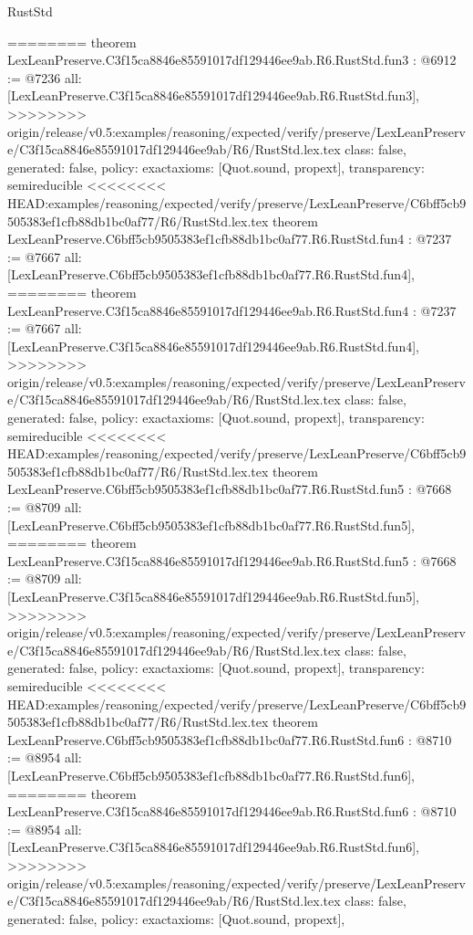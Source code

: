 \begin{lexlean}{RustStd}
\begin{coremodule}
{\begin{coremodule}
{{{{{{========
theorem LexLeanPreserve.C3f15ca8846e85591017df129446ee9ab.R6.RustStd.fun3 : @6912 := @7236 {
  all: [LexLeanPreserve.C3f15ca8846e85591017df129446ee9ab.R6.RustStd.fun3],
>>>>>>>> origin/release/v0.5:examples/reasoning/expected/verify/preserve/LexLeanPreserve/C3f15ca8846e85591017df129446ee9ab/R6/RustStd.lex.tex
  class: false,
  generated: false,
  policy: exact{axioms: [Quot.sound, propext]},
  transparency: semireducible
}
<<<<<<<< HEAD:examples/reasoning/expected/verify/preserve/LexLeanPreserve/C6bff5cb9505383ef1cfb88db1bc0af77/R6/RustStd.lex.tex
theorem LexLeanPreserve.C6bff5cb9505383ef1cfb88db1bc0af77.R6.RustStd.fun4 : @7237 := @7667 {
  all: [LexLeanPreserve.C6bff5cb9505383ef1cfb88db1bc0af77.R6.RustStd.fun4],
========
theorem LexLeanPreserve.C3f15ca8846e85591017df129446ee9ab.R6.RustStd.fun4 : @7237 := @7667 {
  all: [LexLeanPreserve.C3f15ca8846e85591017df129446ee9ab.R6.RustStd.fun4],
>>>>>>>> origin/release/v0.5:examples/reasoning/expected/verify/preserve/LexLeanPreserve/C3f15ca8846e85591017df129446ee9ab/R6/RustStd.lex.tex
  class: false,
  generated: false,
  policy: exact{axioms: [Quot.sound, propext]},
  transparency: semireducible
}
<<<<<<<< HEAD:examples/reasoning/expected/verify/preserve/LexLeanPreserve/C6bff5cb9505383ef1cfb88db1bc0af77/R6/RustStd.lex.tex
theorem LexLeanPreserve.C6bff5cb9505383ef1cfb88db1bc0af77.R6.RustStd.fun5 : @7668 := @8709 {
  all: [LexLeanPreserve.C6bff5cb9505383ef1cfb88db1bc0af77.R6.RustStd.fun5],
========
theorem LexLeanPreserve.C3f15ca8846e85591017df129446ee9ab.R6.RustStd.fun5 : @7668 := @8709 {
  all: [LexLeanPreserve.C3f15ca8846e85591017df129446ee9ab.R6.RustStd.fun5],
>>>>>>>> origin/release/v0.5:examples/reasoning/expected/verify/preserve/LexLeanPreserve/C3f15ca8846e85591017df129446ee9ab/R6/RustStd.lex.tex
  class: false,
  generated: false,
  policy: exact{axioms: [Quot.sound, propext]},
  transparency: semireducible
}
<<<<<<<< HEAD:examples/reasoning/expected/verify/preserve/LexLeanPreserve/C6bff5cb9505383ef1cfb88db1bc0af77/R6/RustStd.lex.tex
theorem LexLeanPreserve.C6bff5cb9505383ef1cfb88db1bc0af77.R6.RustStd.fun6 : @8710 := @8954 {
  all: [LexLeanPreserve.C6bff5cb9505383ef1cfb88db1bc0af77.R6.RustStd.fun6],
========
theorem LexLeanPreserve.C3f15ca8846e85591017df129446ee9ab.R6.RustStd.fun6 : @8710 := @8954 {
  all: [LexLeanPreserve.C3f15ca8846e85591017df129446ee9ab.R6.RustStd.fun6],
>>>>>>>> origin/release/v0.5:examples/reasoning/expected/verify/preserve/LexLeanPreserve/C3f15ca8846e85591017df129446ee9ab/R6/RustStd.lex.tex
  class: false,
  generated: false,
  policy: exact{axioms: [Quot.sound, propext]},
}}}}}}}}}}
\end{coremodule}}
\end{coremodule}
\end{lexlean}
